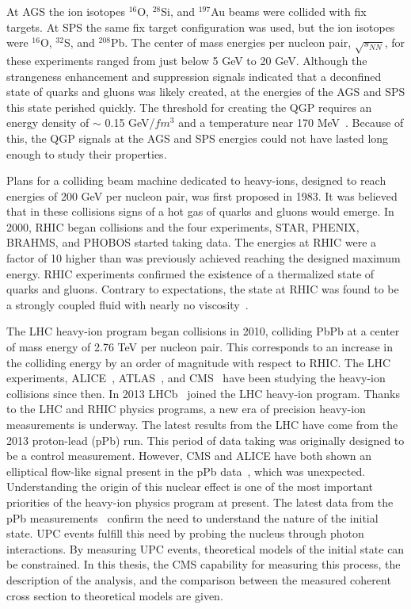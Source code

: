   At AGS the ion isotopes $^{16}$O, $^{28}$Si, and $^{197}$Au beams were 
    collided with fix targets. 
  At SPS the same fix target configuration was used, but the ion isotopes were 
    $^{16}$O, $^{32}$S, and $^{208}$Pb.
  The center of mass energies per nucleon pair, $\sqrt{s_{NN}}$, for these 
    experiments ranged from just below 5 GeV to 20 GeV. 
  Although the strangeness enhancement and \JPsi{} suppression 
    signals indicated that a deconfined state of quarks and gluons was likely 
    created, at the energies of the AGS and SPS this state perished quickly. 
  The threshold for creating the QGP requires an energy density of $\sim$ 0.15 
    GeV/$fm$$^{3}$ and a temperature near 170 MeV~\cite{Karsch:2000kv,Hands:2001ve}.
  Because of this, the QGP signals at the AGS and SPS energies could 
    not have lasted long enough to study their properties. 

  Plans for a colliding beam machine dedicated to heavy-ions, designed to reach 
    energies of 200 GeV per nucleon pair, was first proposed in 1983.
  It was believed that in these collisions signs of a hot gas of quarks and 
    gluons would emerge.
  In 2000, RHIC began collisions and the four experiments,
    STAR, PHENIX, BRAHMS, and PHOBOS started taking data. 
  The energies at RHIC were a factor of 10 higher than was previously achieved
    reaching the designed maximum energy. 
  RHIC experiments confirmed the existence of a thermalized state of quarks and 
    gluons.
  Contrary to expectations, the state at RHIC was found to be 
    a strongly coupled fluid with nearly no viscosity~\cite{longrage2008}.

  The LHC heavy-ion program began collisions in 2010, colliding PbPb at 
    a center of mass energy of 2.76 TeV per nucleon pair. 
  This corresponds to an increase in the colliding energy by an order of 
    magnitude with respect to RHIC. 
  The LHC experiments, ALICE~\cite{Aamodt:2008zz}, ATLAS~\cite{Aad:2008zzm}, and CMS~\cite{tCmsE} have been studying the heavy-ion 
    collisions since then. 
  In 2013 LHCb~\cite{Alves:2008zz} joined the LHC heavy-ion program. 
  Thanks to the LHC and RHIC physics programs, a new era of precision
    heavy-ion measurements is underway. 
  The latest results from the LHC have come from the 2013 proton-lead (pPb)
    run.
  This period of data taking was originally designed to be a control 
    measurement.
  However, CMS and ALICE have both shown an elliptical flow-like signal present
    in the pPb data~\cite{Chatrchyan:2013nka,Abelev:2012ola}, which was unexpected.
  Understanding the origin of this nuclear effect is one of the most important
    priorities of the heavy-ion physics program at present. 
  The latest data from the pPb measurements~\cite{Roland:2014jsa} confirm the need to 
    understand the nature of the initial state. 
  UPC events fulfill this need by probing the nucleus through photon 
    interactions.
  By measuring UPC \JPsi{} events, theoretical models of the initial state can 
    be constrained.
  In this thesis, the CMS capability for measuring this process, the 
    description of the analysis, and the comparison between the measured 
    coherent \JPsi{} cross section to theoretical models are given. 

